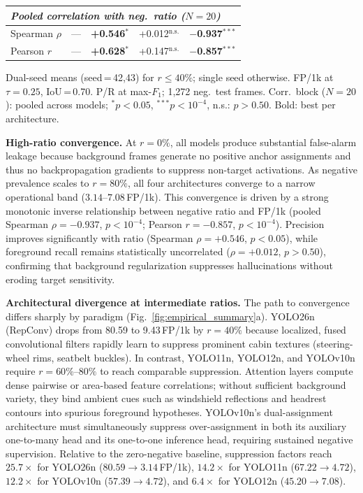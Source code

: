 \documentclass[conference]{IEEEtran}
\begin{document}
\begin{table}[t]
\begin{tabular}{llccccc}
\midrule
\multicolumn{7}{l}{{\footnotesize\textit{Pooled correlation with neg.\ ratio ($N{=}20$)}}} \\
\midrule
\multicolumn{2}{l}{Spearman $\rho$} &
  \multicolumn{2}{c}{---} &
  \textbf{+0.546}$^{*}$ & +0.012$^{\text{n.s.}}$ &
  \textbf{$-$0.937}$^{***}$ \\
\multicolumn{2}{l}{Pearson $r$}   &
  \multicolumn{2}{c}{---} &
  \textbf{+0.628}$^{*}$ & +0.147$^{\text{n.s.}}$ &
  \textbf{$-$0.857}$^{***}$ \\
\bottomrule
\end{tabular}
\vspace{1pt}
{\footnotesize Dual-seed means (seed\,=\,42,43) for $r \!\le\! 40\%$;
single seed otherwise. FP/1k at $\tau{=}0.25$, IoU\,=\,0.70.
P/R at max-$F_1$; 1,272 neg.\ test frames.
Corr.\ block ($N{=}20$): pooled across models;
$^{*}p{<}0.05$, $^{***}p{<}10^{-4}$, n.s.: $p{>}0.50$.
Bold: best per architecture.}
\end{table}

\noindent\textbf{High-ratio convergence.}
At $r{=}0\%$, all models produce substantial false-alarm leakage
because background frames generate no positive anchor assignments
and thus no backpropagation gradients to suppress non-target
activations. As negative prevalence scales to $r{=}80\%$, all four
architectures converge to a narrow operational band
($3.14$--$7.08$\,FP/1k). This convergence is driven by a strong
monotonic inverse relationship between negative ratio and FP/1k
(pooled Spearman $\rho{=}-0.937$, $p{<}10^{-4}$; Pearson
$r{=}-0.857$, $p{<}10^{-4}$). Precision improves significantly
with ratio (Spearman $\rho{=}+0.546$, $p{<}0.05$), while foreground
recall remains statistically uncorrelated ($\rho{=}+0.012$,
$p{>}0.50$), confirming that background regularization suppresses
hallucinations without eroding target sensitivity.

\noindent\textbf{Architectural divergence at intermediate ratios.}
The path to convergence differs sharply by paradigm
(Fig.~\ref{fig:empirical_summary}a). YOLO26n (RepConv) drops from
80.59 to 9.43\,FP/1k by $r{=}40\%$ because localized, fused
convolutional filters rapidly learn to suppress prominent cabin
textures (steering-wheel rims, seatbelt buckles). In contrast,
YOLO11n, YOLO12n, and YOLOv10n require $r{=}60\%$--$80\%$ to
reach comparable suppression. Attention layers compute dense
pairwise or area-based feature correlations; without sufficient
background variety, they bind ambient cues such as windshield
reflections and headrest contours into spurious foreground
hypotheses. YOLOv10n's dual-assignment architecture must
simultaneously suppress over-assignment in both its auxiliary
one-to-many head and its one-to-one inference head, requiring
sustained negative supervision. Relative to the zero-negative
baseline, suppression factors reach $25.7\times$ for YOLO26n
($80.59 \to 3.14$\,FP/1k), $14.2\times$ for YOLO11n ($67.22 \to 4.72$),
$12.2\times$ for YOLOv10n ($57.39 \to 4.72$), and $6.4\times$ for
YOLO12n ($45.20 \to 7.08$).
\end{document}
